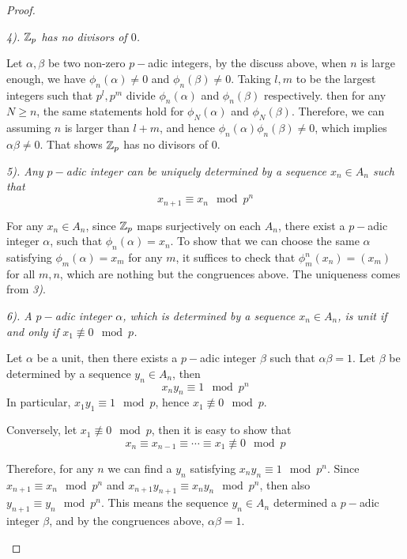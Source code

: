 \begin{proof}
\begin{enumerate}[a)]
        \emph{4). ${\mathbb Z}_p$ has no divisors of $0$.}

        Let $\alpha,\beta$ be two non-zero $p-$adic integers, by the discuss above, when $n$ is large enough, we have $\phi_n(\alpha)\neq0$ and $\phi_n(\beta)\neq0$.
        Taking $l,m$ to be the largest integers such that $p^l,p^m$ divide $\phi_n(\alpha)$ and $\phi_n(\beta)$ respectively. then for any $N\geqslant n$, the same statements hold for $\phi_N(\alpha)$ and $\phi_N(\beta)$. Therefore, we can assuming $n$ is larger than $l+m$, and hence $\phi_n(\alpha)\phi_n(\beta)\neq0$, which implies $\alpha\beta\neq0$. That shows ${\mathbb Z}_p$ has no divisors of $0$.

        \emph{5). Any $p-$adic integer can be uniquely determined by a sequence $x_n\in A_n$ such that}
             \begin{equation*}
                x_{n+1} \equiv x_n \mod p^n
             \end{equation*}

        For any $x_n\in A_n$, since ${\mathbb Z}_p$ maps surjectively on each $A_n$, there exist a $p-$adic integer $\alpha$, such that $\phi_n(\alpha)=x_n$. To show that we can choose the same $\alpha$ satisfying $\phi_m(\alpha)=x_m$ for any $m$, it suffices to check that $\phi^n_m(x_n)=(x_m)$ for all $m,n$, which are nothing but the congruences above. The uniqueness comes from \emph{3)}.

        \emph{6). A $p-$adic integer $\alpha$, which is determined by a sequence $x_n\in A_n$, is unit if and only if $x_1\not\equiv 0 \mod p$.}

        Let $\alpha$ be a unit, then there exists a $p-$adic integer $\beta$ such that $\alpha\beta=1$. Let $\beta$ be determined by a sequence $y_n\in A_n$, then
        \begin{equation*}
          x_ny_n \equiv 1\mod p^n
        \end{equation*}
        In particular, $x_1y_1\equiv 1\mod p$, hence $x_1\not\equiv 0 \mod p$.

        Conversely, let $x_1\not\equiv 0\mod p$, then it is easy to show that
        \begin{equation*}
          x_n\equiv x_{n-1}\equiv \cdots \equiv x_1 \not\equiv 0 \mod p
        \end{equation*}

        Therefore, for any $n$ we can find a $y_n$ satisfying $x_ny_n \equiv 1\mod p^n$.
        Since $x_{n+1}\equiv x_n\mod p^n$ and $x_{n+1}y_{n+1}\equiv x_ny_n \mod p^n$, then also $y_{n+1}\equiv y_n\mod p^n$. This means the sequence $y_n\in A_n$ determined a $p-$adic integer $\beta$, and by the congruences above, $\alpha\beta=1$.


\end{enumerate}
\end{proof}
